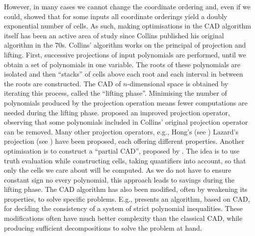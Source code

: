 \documentclass[
]{book}
\theoremstyle{definition}
\theoremstyle{definition}
\theoremstyle{definition}
\theoremstyle{definition}
\theoremstyle{remark}
\begin{document}
However, in many cases we cannot change the coordinate ordering and, even if we could, \citet{brown07} showed that for some inputs all coordinate orderings yield a doubly exponential number of cells. As such, making optimisations in the CAD algorithm itself has been an active area of study since Collins published his original algorithm in the 70s. Collins' algorithm works on the principal of projection and lifting. First, successive projections of input polynomials are performed, until we obtain a set of polynomials in one variable. The roots of these polynomials are isolated and then ``stacks'' of cells above each root and each interval in between the roots are constructed. The CAD of \(n\)-dimensional space is obtained by iterating this process, called the ``lifting phase''.
Minimising the number of polynomials produced by the projection operation means fewer computations are needed during the lifting phase. \citet{mccallum1998} proposed an improved projection operator, observing that some polynomials included in Collins' original projection operator can be removed. Many other projection operators, e.g., Hong's (see \citet{hong1990}) Lazard's projection (see \citet{mccallum2019}) have been proposed, each offering different properties. Another optimisation is to construct a ``partial CAD'', proposed by \citet{collins1991}. The idea is to use truth evaluation while constructing cells, taking quantifiers into account, so that only the cells we care about will be computed. As we do not have to ensure constant sign no every polynomial, this approach leads to savings during the lifting phase. The CAD algorithm has also been modified, often by weakening its properties, to solve specific problems. E.g., \citet{mccallum1993} presents an algorithm, based on CAD, for deciding the consistency of a system of strict polynomial inequalities. These modifications often have much better complexity than the classical CAD, while producing sufficient decompositions to solve the problem at hand.
\end{document}
